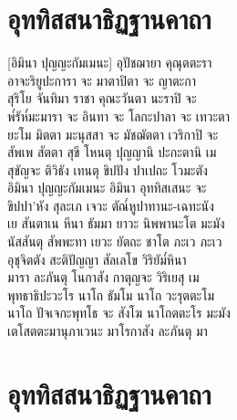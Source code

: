 \chapter{อุททิสสนาธิฏฐานคาถา}
\begin{leader}
\end{leader}

[อิมินา ปุญญะกัมเมนะ] อุปัชฌายา คุณุตตะรา\\
อาจะริยูปะการา จะ มาตาปิตา จะ ญาตะกา\\
สุริโย จันทิมา ราชา คุณะวันตา นะราปิ จะ\\
พ๎รัห๎มะมารา จะ อินทา จะ โลกะปาลา จะ เทวะตา\\
ยะโม มิตตา มะนุสสา จะ มัชฌัตตา เวริกาปิ จะ\\
สัพเพ สัตตา สุขี โหนตุ ปุญญานิ ปะกะตานิ เม\\
สุขัญจะ ติวิธัง เทนตุ ขิปปัง ปาเปถะ โวมะตัง\\
อิมินา ปุญญะกัมเมนะ อิมินา อุททิสเสนะ จะ\\
ขิปปา’หัง สุละเภ เจวะ ตัณ๎หูปาทานะ-เฉทะนัง\\
เย สันตาเน หีนา ธัมมา ยาวะ นิพพานะโต มะมัง\\
นัสสันตุ สัพพะทา เยวะ ยัตถะ ชาโต ภะเว ภะเว\\
อุชุจิตตัง สะติปัญญา สัลเลโข วิริยัม๎หินา\\
มารา ละภันตุ โนกาสัง กาตุญจะ วิริเยสุ เม\\
พุทธาธิปะวะโร นาโถ ธัมโม นาโถ วะรุตตะโม\\
นาโถ ปัจเจกะพุทโธ จะ สังโฆ นาโถตตะโร มะมัง\\
เตโสตตะมานุภาเวนะ มาโรกาสัง ละภันตุ มา\\
\clearpage

\chapter{อุททิสสนาธิฏฐานคาถา}

\begin{leader}
\end{leader}

